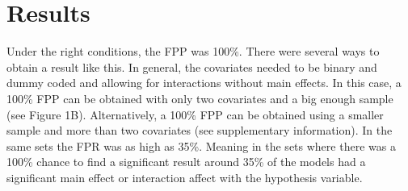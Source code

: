 \section{Results} 
Under the right conditions, the FPP was 100\%. There were several ways to obtain a result like this. In general, the covariates needed to be binary and dummy coded and allowing for interactions without main effects. In this case, a 100\% FPP can be obtained with only two covariates and a big enough sample (see Figure 1B). Alternatively, a 100\% FPP can be obtained using a smaller sample and more than two covariates (see supplementary information). In the same sets the FPR was as high as 35\%. Meaning in the sets where there was a 100\% chance to find a significant result around 35\% of the models had a significant main effect or interaction affect with the hypothesis variable. 

